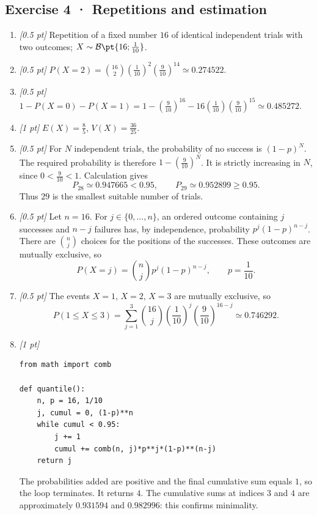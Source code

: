 \subsection*{Exercise 4 · Repetitions and estimation}\begin{enumerate}

\item \textit{[0.5 pt]} Repetition of a fixed number $16$ of identical independent trials with two outcomes; $X\sim\mathcal B\pt{16;\frac{1}{10}}$.

\item \textit{[0.5 pt]} $P(X=2)=\binom{16}2(\frac{1}{10})^2(\frac{9}{10})^{14}\simeq\num{0,274522}$.

\item \textit{[0.5 pt]} $1-P(X=0)-P(X=1)=1-(\frac{9}{10})^{16}-16(\frac{1}{10})(\frac{9}{10})^{15}\simeq\num{0,485272}$.

\item \textit{[1 pt]} $E(X)=\frac{8}{5}$, $V(X)=\frac{36}{25}$.

\item \textit{[0.5 pt]} For $N$ independent trials, the probability of no success is $(1-p)^N$. The required probability is therefore $1-(\frac{9}{10})^N$. It is strictly increasing in $N$, since $0<\frac{9}{10}<1$. Calculation gives
\[P_{28}\simeq\num{0,947665}<\num{0,95},\qquad P_{29}\simeq\num{0,952899}\ge\num{0,95}.\]
Thus $29$ is the smallest suitable number of trials.

\item \textit{[0.5 pt]} Let $n=16$. For $j\in\{0,\ldots,n\}$, an ordered outcome containing $j$ successes and $n-j$ failures has, by independence, probability $p^j(1-p)^{n-j}$. There are $\binom nj$ choices for the positions of the successes. These outcomes are mutually exclusive, so
\[P(X=j)=\binom nj p^j(1-p)^{n-j},\qquad p=\frac{1}{10}.\]

\item \textit{[0.5 pt]} The events $X=1$, $X=2$, $X=3$ are mutually exclusive, so
\[P(1\le X\le3)=\sum_{j=1}^3\binom{16}j(\frac{1}{10})^j(\frac{9}{10})^{16-j}\simeq\num{0,746292}.\]


\item \textit{[1 pt]} 
\begin{lstlisting}
from math import comb

def quantile():
    n, p = 16, 1/10
    j, cumul = 0, (1-p)**n
    while cumul < 0.95:
        j += 1
        cumul += comb(n, j)*p**j*(1-p)**(n-j)
    return j
\end{lstlisting}
The probabilities added are positive and the final cumulative sum equals $1$, so the loop terminates. It returns $4$. The cumulative sums at indices $3$ and $4$ are approximately $\num{0,931594}$ and $\num{0,982996}$: this confirms minimality.

\end{enumerate}

